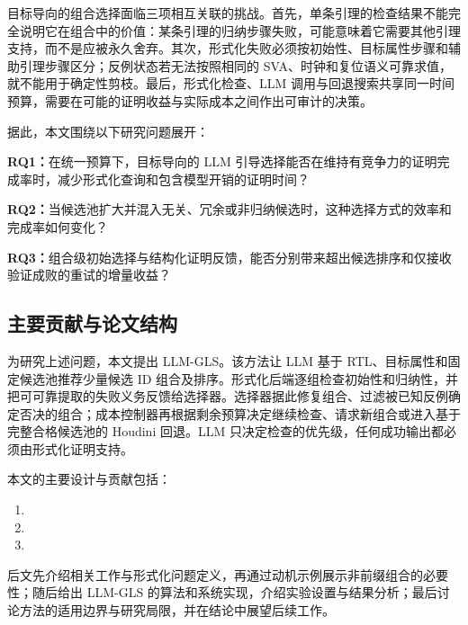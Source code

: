 目标导向的组合选择面临三项相互关联的挑战。首先，单条引理的检查结果不能完全说明它在组合中的价值：某条引理的归纳步骤失败，可能意味着它需要其他引理支持，而不是应被永久舍弃。其次，形式化失败必须按初始性、目标属性步骤和辅助引理步骤区分；反例状态若无法按照相同的 SVA、时钟和复位语义可靠求值，就不能用于确定性剪枝。最后，形式化检查、LLM 调用与回退搜索共享同一时间预算，需要在可能的证明收益与实际成本之间作出可审计的决策。

据此，本文围绕以下研究问题展开：

\noindent\textbf{RQ1：}在统一预算下，目标导向的 LLM 引导选择能否在维持有竞争力的证明完成率时，减少形式化查询和包含模型开销的证明时间？\par
\noindent\textbf{RQ2：}当候选池扩大并混入无关、冗余或非归纳候选时，这种选择方式的效率和完成率如何变化？\par
\noindent\textbf{RQ3：}组合级初始选择与结构化证明反馈，能否分别带来超出候选排序和仅接收验证成败的重试的增量收益？

\subsection{主要贡献与论文结构}

为研究上述问题，本文提出 LLM-GLS。该方法让 LLM 基于 RTL、目标属性和固定候选池推荐少量候选 ID 组合及排序。形式化后端逐组检查初始性和归纳性，并把可可靠提取的失败义务反馈给选择器。选择器据此修复组合、过滤被已知反例确定否决的组合；成本控制器再根据剩余预算决定继续检查、请求新组合或进入基于完整合格候选池的 Houdini 回退。LLM 只决定检查的优先级，任何成功输出都必须由形式化证明支持。

本文的主要设计与贡献包括：
\begin{enumerate}
  \item 
  \item 
  \item 
\end{enumerate}

后文先介绍相关工作与形式化问题定义，再通过动机示例展示非前缀组合的必要性；随后给出 LLM-GLS 的算法和系统实现，介绍实验设置与结果分析；最后讨论方法的适用边界与研究局限，并在结论中展望后续工作。
